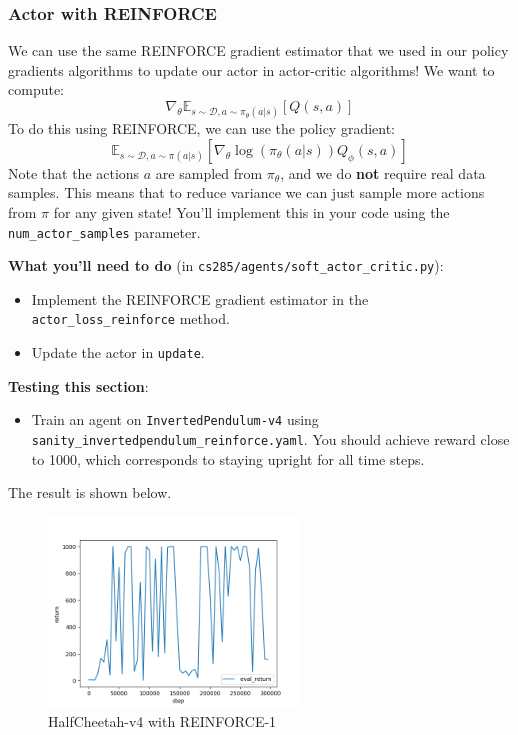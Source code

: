\subsubsection{Actor with REINFORCE}
We can use the same REINFORCE gradient estimator that we used in our policy gradients algorithms to update our actor in actor-critic algorithms! We want to compute:
\[\nabla_\theta\mathbb{E}_{s \sim \mathcal{D}, a \sim \pi_\theta(a|s)}\left[Q(s, a)\right]\]
To do this using REINFORCE, we can use the policy gradient:
\[\mathbb{E}_{s \sim \mathcal{D}, a \sim \pi(a|s)}\left[\nabla_\theta \log(\pi_\theta(a|s))Q_\phi(s, a)\right]\]
Note that the actions $a$ are sampled from $\pi_\theta$, and we do \textbf{not} require real data samples. This means that to reduce variance we can just sample more actions from $\pi$ for any given state! You'll implement this in your code using the \verb|num_actor_samples| parameter.

\textbf{What you'll need to do} (in \verb|cs285/agents/soft_actor_critic.py|):
\begin{itemize}
    \item Implement the REINFORCE gradient estimator in the \verb|actor_loss_reinforce| method.
    \item Update the actor in \verb|update|.
\end{itemize}

\textbf{Testing this section}:
\begin{itemize}
    \item Train an agent on \verb|InvertedPendulum-v4| using \verb|sanity_invertedpendulum_reinforce.yaml|. You should achieve reward close to 1000, which corresponds to staying upright for all time steps.
\end{itemize}

\MYSOLUTION The result is shown below.

\begin{figure}[H]
    \centering
    \includegraphics[width=0.6\textwidth]{../report/assets/P3-1-3-1.png}
    \caption{HalfCheetah-v4 with REINFORCE-1}
    \label{fig:halfcheetah-v4-reinforce-1}
\end{figure}

